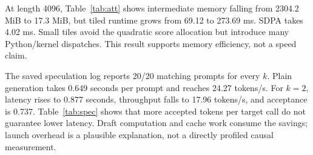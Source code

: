 \documentclass[conference]{IEEEtran}
\begin{document}
\begin{table}[t]\centering\caption{Recorded attention benchmark. Memory is extra allocated GPU memory; errors compare tiled output with a reference.}\label{tab:att}
\end{table}
At length 4096, Table~\ref{tab:att} shows intermediate memory falling from 2304.2 MiB to 17.3 MiB, but tiled runtime grows from 69.12 to 273.69 ms. SDPA takes 4.02 ms. Small tiles avoid the quadratic score allocation but introduce many Python/kernel dispatches. This result supports memory efficiency, not a speed claim.

\begin{table}[t]\centering\caption{Recorded speculative results for different draft lengths.}\label{tab:spec}
\resizebox{\columnwidth}{!}{}\end{table}
The saved speculation log reports 20/20 matching prompts for every $k$. Plain generation takes 0.649 seconds per prompt and reaches 24.27 tokens/s. For $k=2$, latency rises to 0.877 seconds, throughput falls to 17.96 tokens/s, and acceptance is 0.737. Table~\ref{tab:spec} shows that more accepted tokens per target call do not guarantee lower latency. Draft computation and cache work consume the savings; launch overhead is a plausible explanation, not a directly profiled causal measurement.
\end{document}
